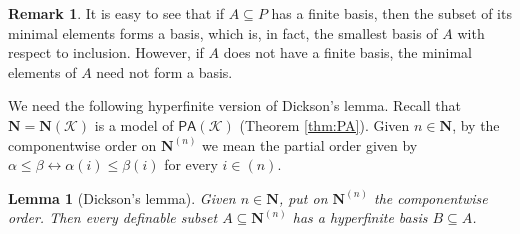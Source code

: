 \documentclass{amsart}
\newcommand{\ca}{\mathcal}
\theoremstyle{plain}
\newtheorem{lem}[thm]{Lemma}
\theoremstyle{definition}
\newtheorem{rem}[thm]{Remark}
\newcommand{\PA}{\mathsf{PA}}
\newcommand{\hn}{\mathbf N}
\begin{document}
\begin{rem} It is easy to see that if $A \subseteq P$ has a finite basis, then the subset of its minimal elements forms a basis, which is, in fact, the smallest basis of $A$ with respect to inclusion. However, if $A$ does not have a finite basis, the minimal elements of $A$ need not form a basis. 
\end{rem}

We need the following hyperfinite version of Dickson's lemma. Recall that $\hn = \hn(\ca K)$ is a model of $\PA(\ca K)$ (Theorem \ref{thm:PA}). Given $n \in \hn$, by the componentwise order on $\hn^{(n)}$ we mean the partial order given by $\alpha \leq \beta \leftrightarrow \alpha(i) \leq \beta(i)$ for every $i \in (n)$. 

\begin{lem}[Dickson's lemma] \label{lem:Dikson}
Given $n\in \hn$, put on $\hn^{(n)}$ the componentwise order. Then every definable subset $A\subseteq \hn^{(n)}$ has a hyperfinite basis $B\subseteq A$.  
\end{lem}
\end{document}
